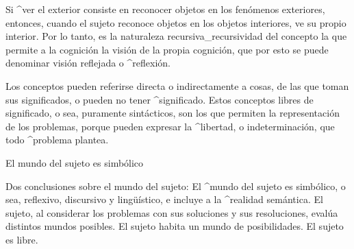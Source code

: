Si ^{ver} el exterior consiste en reconocer objetos en los fenómenos
exteriores, entonces, cuando el sujeto reconoce objetos en los objetos
interiores, ve su propio interior. Por lo tanto, es la naturaleza
recursiva_{recursividad} del concepto la que permite a la cognición la
visión de la propia cognición, que por esto se puede denominar visión
reflejada o ^{reflexión}.

Los conceptos pueden referirse directa o indirectamente a cosas, de las
que toman sus significados, o pueden no tener ^{significado}. Estos
conceptos libres de significado, o sea, puramente sintácticos, son los
que permiten la representación de los problemas, porque pueden expresar
la ^{libertad}, o indeterminación, que todo ^{problema} plantea.


\Section El mundo del sujeto es simbólico

Dos conclusiones sobre el mundo del sujeto:
\point El ^{mundo} del sujeto es simbólico, o sea, reflexivo, discursivo y
lingüístico, e incluye a la ^{realidad} semántica.
\point El sujeto, al considerar los problemas con sus soluciones y sus
resoluciones, evalúa distintos mundos posibles. El sujeto habita un
mundo de posibilidades. El sujeto es libre.


\endinput
